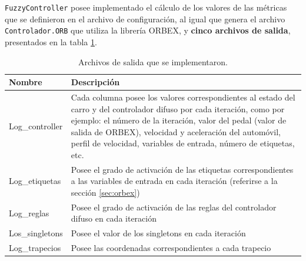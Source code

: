 
{\tt FuzzyController} posee implementado el cálculo de los valores de las métricas que se definieron en el archivo de configuración, al igual que genera el archivo {\tt Controlador.ORB} que utiliza la librería \gls{ORBEX}, y \textbf{cinco archivos de salida},  presentados en la tabla \ref{tab:logs}.

\begin{table}[htb]
	\centering
\begin{tabular}{|l|p{12 cm}|}
\hline 
\rowcolor[gray]{0.9} \textbf{Nombre} & \textbf{Descripción} \\ \hline \hline
Log\_controller & Cada columna posee los valores correspondientes al estado del carro y del controlador difuso por cada iteración, como por ejemplo: el número de la iteración, valor del pedal (valor de salida de \gls{ORBEX}), velocidad y aceleración del automóvil, perfil de velocidad, variables de entrada, número de etiquetas, etc. \\ 
\hline 
Log\_etiquetas & Posee el grado de activación de las etiquetas correspondientes a las variables de entrada en cada iteración (referirse a la sección \ref{sec:orbex}) \\ 
\hline 
Log\_reglas & Posee el grado de activación de las reglas del controlador difuso en cada iteración \\ 
\hline 
Los\_singletons & Posee el valor de los singletons en cada iteración \\ 
\hline 
Log\_trapecios & Posee las coordenadas correspondientes a cada trapecio \\ 
\hline 
\end{tabular} 
\caption{Archivos de salida que se implementaron.}
\label{tab:logs}
\end{table}

